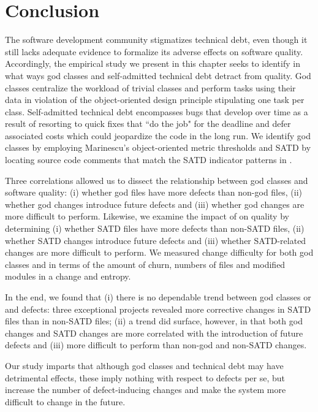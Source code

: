 \section{Conclusion}
\label{chap4:sec:conclusion}


The software development community stigmatizes technical debt, even though it still lacks adequate evidence to formalize its adverse effects on software quality. Accordingly, the empirical study we present in this chapter seeks to identify in what ways god classes and self-admitted technical debt detract from quality. God classes centralize the workload of trivial classes and perform tasks using their data in violation of the object-oriented design principle stipulating one task per class. Self-admitted technical debt encompasses bugs that develop over time as a result of resorting to quick fixes that ``do the job" for the deadline and defer associated costs which could jeopardize the code in the long run. We identify god classes by employing Marinescu's \cite{marinescu2004detection} object-oriented metric thresholds and SATD by locating source code comments that match the SATD indicator patterns in \cite{ICSM_PotdarS14}.


Three correlations allowed us to dissect the relationship between god classes and software quality: (i) whether god files have more defects than non-god files, (ii) whether god changes introduce future defects and (iii) whether god changes are more difficult to perform. Likewise, we examine the impact of \SATD on quality by determining (i) whether SATD files have more defects than non-SATD files, (ii) whether SATD changes introduce future defects and (iii) whether SATD-related changes are more difficult to perform. We measured change difficulty for both god classes and \SATD in terms of the amount of churn, numbers of files and modified modules in a change and entropy.


In the end, we found that (i) there is no dependable trend between god classes or \SATD and defects: three exceptional projects revealed more corrective changes in SATD files than in non-SATD files; (ii) a trend did surface, however, in that both god changes and SATD changes are more correlated with the introduction of future defects and (iii) more difficult to perform than non-god and non-SATD changes. 

Our study imparts that although god classes and technical debt may have detrimental effects, these imply nothing with respect to defects per se, but increase the number of defect-inducing changes and make the system more difficult to change in the future. 